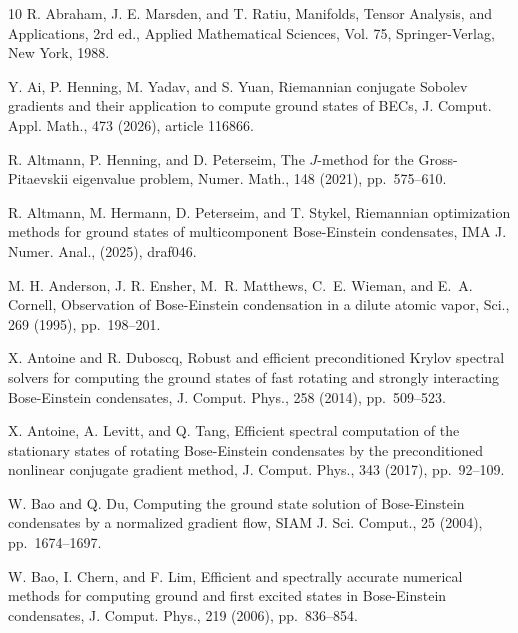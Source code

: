 \documentclass[preprint,3p]{elsarticle}
\begin{document}
\begin{thebibliography}{10}
	R. Abraham, J. E. Marsden, and T. Ratiu, Manifolds, Tensor Analysis, and Applications, 2rd ed., Applied Mathematical Sciences, Vol. 75, Springer-Verlag, New York, 1988.
	
	{ Y. Ai, P. Henning, M. Yadav, and S. Yuan}, { Riemannian conjugate Sobolev gradients and their application to compute ground states of BECs}, J. Comput. Appl. Math., 473 (2026), article 116866.
	
	{ R. Altmann, P. Henning, and D. Peterseim}, { The $J$-method for the Gross-Pitaevskii eigenvalue problem}, Numer. Math., 148 (2021), pp.~575--610.
	
	{ R. Altmann, M. Hermann, D. Peterseim, and T. Stykel}, { Riemannian optimization methods for ground states of multicomponent Bose-Einstein condensates}, IMA J. Numer. Anal., (2025), draf046.
	
	{ M. H. Anderson, J. R. Ensher, M.~R. Matthews, C.~E. Wieman, and E.~A. Cornell},
	{ Observation of Bose-Einstein condensation in a dilute atomic vapor}, Sci., 269 (1995), pp.~198--201.
	
	{ X. Antoine and R. Duboscq}, { Robust and efficient preconditioned Krylov spectral solvers for computing the ground states of fast rotating and strongly interacting Bose-Einstein condensates}, J. Comput. Phys., 258 (2014), pp.~509--523.
	
	{ X. Antoine, A. Levitt, and Q. Tang}, { Efficient spectral computation of the stationary states of rotating Bose-Einstein condensates by the preconditioned nonlinear conjugate gradient method}, J. Comput. Phys., 343 (2017), pp.~92--109.
	
	{ W. Bao and Q. Du}, { Computing the ground state solution of Bose-Einstein condensates by a normalized gradient flow}, SIAM J. Sci. Comput., 25 (2004), pp.~1674--1697.
	
	{ W. Bao, I. Chern, and F. Lim}, { Efficient and spectrally accurate numerical methods for computing ground and first excited states in Bose-Einstein condensates}, J. Comput. Phys., 219 (2006), pp.~836--854.
	
	
	

\end{thebibliography}
\end{document}
